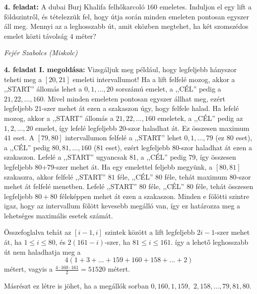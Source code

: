 \documentclass[a4paper,10pt]{article}
\def\ki#1#2{\hfill {\it #1 (#2)}\medskip}
\begin{document}
\medskip


{\bf 4. feladat: } A dubai Burj Khalifa felhőkarcoló $160$ emele\-tes.  Induljon el egy
lift a föld\-szint\-ről, és tételezzük fel, hogy útja során minden
emeleten pontosan egyszer áll meg. Mennyi az a leghosszabb út,
amit eközben megtehet, ha két szomszédos emelet közti
távolság $4$ méter?

\ki{Fejér Szabolcs}{Miskolc}\medskip

{\bf 4. feladat I. megoldása: } Vizsgáljuk meg például, hogy legfeljebb hányszor te\-heti meg a
$[20,21]$  emeleti intervallumot! Ha a lift felfelé mozog, akkor a
,,START'' állomás lehet a $0,1,\dots,20$ sorszámú emelet, a ,,CÉL''
pedig a $21,22,\dots,160.$ Mivel minden emeleten pontosan egyszer
állhat meg, ezért legfeljebb $21$-szer mehet át ezen a szakaszon
úgy, hogy felfele halad. Ha lefelé mozog, akkor a ,,START''
állomás a $21,22,\dots,160$ emeletek, a ,,CÉL'' pedig az
$1,2,\dots,20$ emelet, így lefelé legfeljebb $20$-szor haladhat át.
Ez összesen ma\-xi\-mum $41$ eset. A $[79,80]$ intervallumon felfelé
a ,,START'' lehet $0,1,\dots,79$ (ez $80$ eset), a ,,CÉL'' pedig
$80,81,\dots,160$ ($81$ eset), ezért legfeljebb $80$-szor haladhat
át ezen a szakaszon. Lefelé a ,,START'' ugyancsak 81, a ,,CÉL''
pedig 79, így összesen legfeljebb 80+79-szer mehet át. Ha egy
emelettel feljebb megyünk, a $[80,81]$ szakaszra, akkor felfelé
,,START'' $81$ féle, ,,CÉL'' $80$ féle, tehát maximum $80$-szor
mehet át felfelé menetben. Lefelé ,,START'' $80$ féle, ,,CÉL'' $80$
féle, tehát összesen legfeljebb $80+80$ féleképpen mehet át ezen a
szakaszon. Minden e fölötti szintre igaz, hogy az intervallum fölött
kevesebb megálló van, így ez határozza meg a lehetséges maximális
esetek számát.

Összefoglalva tehát az $[i-1,i]$ szintek között a lift legfeljebb
$2i-1$-szer mehet át, ha $1\leq i\le80$, és $2(161-i)$-szer, ha
$81\leq i\leq 161.$ így a lehető leghosszabb út nem haladhatja meg
a
\[4(1+3+\ldots+159+160+158+\ldots+2)\]
métert, vagyis a $\frac{4\cdot160\cdot161}{2}=51520$ métert.

Másrészt ez létre is jöhet, ha a megállók sorban $0, 160, 1,
159,$ $2,158,\ldots, 79, 81, 80.$

\medskip
\end{document}
